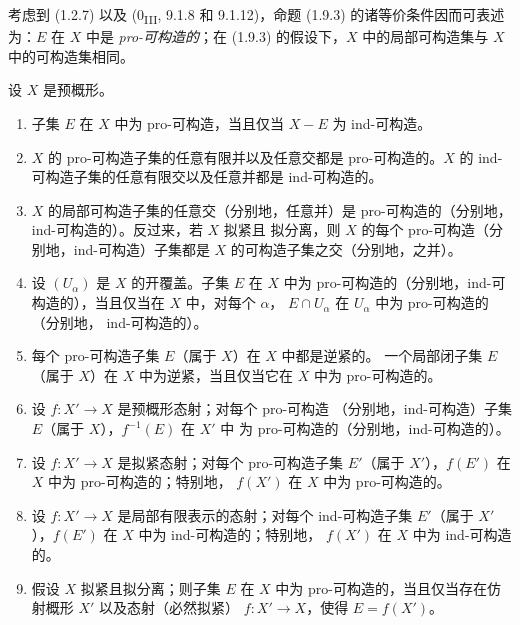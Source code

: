考虑到 (1.2.7) 以及 (0\textsubscript{III}, 9.1.8 和 9.1.12)，命题
(1.9.3) 的诸等价条件因而可表述为：$E$ 在 $X$ 中是
\emph{pro-可构造的}；在 (1.9.3) 的假设下，$X$ 中的局部可构造集与
$X$ 中的可构造集相同。


\begin{proposition}[1.9.5]
\label{IV.1.9.5-fr}
设 $X$ 是预概形。
\begin{enumerate}
  \item[(i)] 子集 $E$ 在 $X$ 中为 pro-可构造，当且仅当 $X-E$ 为
  ind-可构造。
  \item[(ii)] $X$ 的 pro-可构造子集的任意有限并以及任意交都是
  pro-可构造的。$X$ 的 ind-可构造子集的任意有限交以及任意并都是
  ind-可构造的。
  \item[(iii)] $X$ 的局部可构造子集的任意交（分别地，任意并）是
  pro-可构造的（分别地，ind-可构造的）。反过来，若 $X$ 拟紧且
  拟分离，则 $X$ 的每个 pro-可构造（分别地，ind-可构造）子集都是
  $X$ 的可构造子集之交（分别地，之并）。
  \item[(iv)] 设 $(U_\alpha)$ 是 $X$ 的开覆盖。子集 $E$ 在 $X$ 中为
  pro-可构造的（分别地，ind-可构造的），当且仅当在 $X$ 中，对每个 $\alpha$，
  $E\cap U_\alpha$ 在 $U_\alpha$ 中为 pro-可构造的（分别地，
  ind-可构造的）。
  \item[(v)] 每个 pro-可构造子集 $E$（属于 $X$）在 $X$ 中都是逆紧的。
  一个局部闭子集 $E$（属于 $X$）在 $X$ 中为逆紧，当且仅当它在
  $X$ 中为 pro-可构造的。
  \item[(vi)] 设 $f:X'\to X$ 是预概形态射；对每个 pro-可构造
  （分别地，ind-可构造）子集 $E$（属于 $X$），$f^{-1}(E)$ 在 $X'$ 中
  为 pro-可构造的（分别地，ind-可构造的）。
  \item[(vii)] 设 $f:X'\to X$ 是拟紧态射；对每个 pro-可构造子集
  $E'$（属于 $X'$），$f(E')$ 在 $X$ 中为 pro-可构造的；特别地，
  $f(X')$ 在 $X$ 中为 pro-可构造的。
  \item[(viii)] 设 $f:X'\to X$ 是局部有限表示的态射；对每个
  ind-可构造子集 $E'$（属于 $X'$），$f(E')$ 在 $X$ 中为 ind-可构造的；特别地，
  $f(X')$ 在 $X$ 中为 ind-可构造的。
  \item[(ix)] 假设 $X$ 拟紧且拟分离；则子集 $E$ 在 $X$ 中为
  pro-可构造的，当且仅当存在仿射概形 $X'$ 以及态射（必然拟紧）
  $f:X'\to X$，使得 $E=f(X')$。
\end{enumerate}
\end{proposition}

